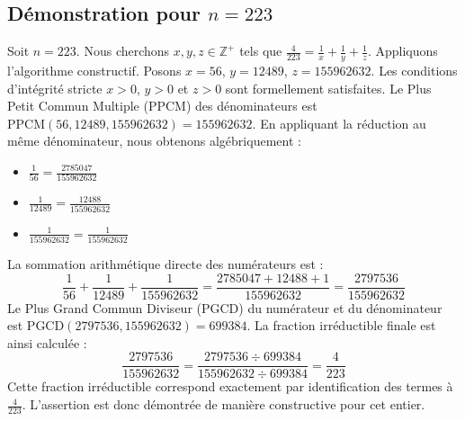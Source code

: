 \documentclass[11pt,a4paper]{article}
\begin{document}
\subsection{Démonstration pour $n = 223$}
Soit $n = 223$. Nous cherchons $x, y, z \in \mathbb{Z}^{+}$ tels que $\frac{4}{223} = \frac{1}{x} + \frac{1}{y} + \frac{1}{z}$.
Appliquons l'algorithme constructif. Posons $x = 56$, $y = 12489$, $z = 155962632$.
Les conditions d'intégrité stricte $x > 0$, $y > 0$ et $z > 0$ sont formellement satisfaites.
Le Plus Petit Commun Multiple (PPCM) des dénominateurs est $\text{PPCM}(56, 12489, 155962632) = 155962632$.
En appliquant la réduction au même dénominateur, nous obtenons algébriquement :
\begin{itemize}
    \item $\frac{1}{56} = \frac{2785047}{155962632}$
    \item $\frac{1}{12489} = \frac{12488}{155962632}$
    \item $\frac{1}{155962632} = \frac{1}{155962632}$
\end{itemize}
La sommation arithmétique directe des numérateurs est :
$$ \frac{1}{56} + \frac{1}{12489} + \frac{1}{155962632} = \frac{2785047 + 12488 + 1}{155962632} = \frac{2797536}{155962632} $$
Le Plus Grand Commun Diviseur (PGCD) du numérateur et du dénominateur est $\text{PGCD}(2797536, 155962632) = 699384$.
La fraction irréductible finale est ainsi calculée :
$$ \frac{2797536}{155962632} = \frac{2797536 \div 699384}{155962632 \div 699384} = \frac{4}{223} $$
Cette fraction irréductible correspond exactement par identification des termes à $\frac{4}{223}$. L'assertion est donc démontrée de manière constructive pour cet entier.
\end{document}
